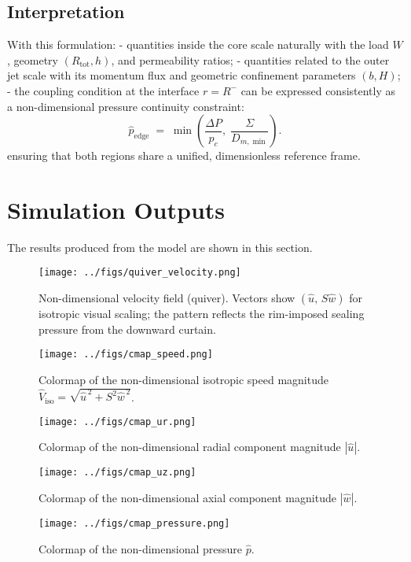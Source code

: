 \documentclass[11pt,a4paper]{article}
\begin{document}
\subsection{Interpretation}

With this formulation:
- quantities inside the core scale naturally with the load \(W\), geometry \((R_{\mathrm{tot}},h)\), and permeability ratios;
- quantities related to the outer jet scale with its momentum flux and geometric confinement parameters \((b,H)\);
- the coupling condition at the interface \(r = R^{-}\) can be expressed consistently as a non-dimensional pressure continuity constraint:
  \[
  \hat{p}_{\mathrm{edge}} \;=\; 
  \min\!\left( 
      \frac{\Delta P}{p_c}, \;
      \frac{\Sigma}{D_{m,\min}}
  \right).
  \]
  ensuring that both regions share a unified, dimensionless reference frame.



\section{Simulation Outputs}
\label{sec:simulation-outputs}

The results produced from the model are shown in this section.

\begin{figure}[H]
  \centering
  \texttt{[image: ../figs/quiver\_velocity.png]}
  \caption{Non-dimensional velocity field (quiver).
Vectors show $(\hat u,\,S\hat w)$ for isotropic visual scaling; the pattern reflects the rim-imposed sealing pressure from the downward curtain.}
  \label{fig:quiver}
\end{figure}
\begin{figure}[H]
  \centering
  \texttt{[image: ../figs/cmap\_speed.png]}
  \caption{Colormap of the non-dimensional isotropic speed magnitude $\hat V_{\mathrm{iso}}=\sqrt{\hat u^{\,2}+S^{2}\hat w^{\,2}}$.}
  \label{fig:cmap_speed}
\end{figure}
\begin{figure}[H]
  \centering
  \texttt{[image: ../figs/cmap\_ur.png]}
  \caption{Colormap of the non-dimensional radial component magnitude $|\hat u|$.}
  \label{fig:cmap_ur}
\end{figure}
\begin{figure}[H]
  \centering
  \texttt{[image: ../figs/cmap\_uz.png]}
  \caption{Colormap of the non-dimensional axial component magnitude $|\hat w|$.}
  \label{fig:cmap_uz}
\end{figure}
\begin{figure}[H]
  \centering
  \texttt{[image: ../figs/cmap\_pressure.png]}
  \caption{Colormap of the non-dimensional pressure $\hat p$.}
  \label{fig:cmap_p}
\end{figure}
\end{document}
